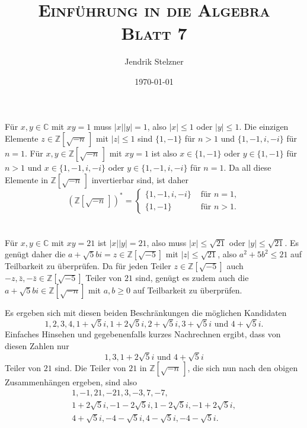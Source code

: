 \documentclass[a4paper,10pt]{article}
\title{\textsc{Einführung in die Algebra \\ \Large Blatt 7}}
\author{Jendrik Stelzner}
\date{\today}
\theoremstyle{definition}
\newcommand{\Z}{\mathbb{Z}}
\newcommand{\C}{\mathbb{C}}
\begin{document}
\maketitle





\section{}
Für $x,y \in \C$ mit $xy = 1$ muss $|x||y| = 1$, also $|x| \leq 1$ oder $|y| \leq 1$. Die einzigen Elemente $z \in \Z\left[\sqrt{-n}\,\right]$ mit $|z| \leq 1$ sind $\{1,-1\}$ für $n>1$ und $\{1,-1,i,-i\}$ für $n=1$. Für $x,y \in \Z\left[\sqrt{-n}\,\right]$ mit $xy = 1$ ist also $x \in \{1,-1\}$ oder $y \in \{1,-1\}$ für $n > 1$ und $x \in \{1,-1,i,-i\}$ oder $y \in \{1,-1,i,-i\}$ für $n=1$. Da all diese Elemente in $\Z\left[\sqrt{-n}\,\right]$ invertierbar sind, ist daher
\[
 \left(\Z\left[\sqrt{-n}\,\right]\right)^* =
 \begin{cases}
  \{1,-1,i,-i\} & \text{ für } n = 1, \\
  \{1,-1\}      & \text{ für } n > 1.
 \end{cases}
\]





\section{}
Für $x,y \in \C$ mit $xy=21$ ist $|x||y| = 21$, also muss $|x| \leq \sqrt{21}$ oder $|y| \leq \sqrt{21}$. Es genügt daher die $a+\sqrt{5}bi = z \in \Z[\sqrt{-5}]$ mit $|z| \leq \sqrt{21}$, also $a^2 + 5b^2 \leq 21$ auf Teilbarkeit zu überprüfen. Da für jeden Teiler $z \in \Z[\sqrt{-5}]$ auch $-z, \bar{z}, -\bar{z} \in \Z[\sqrt{-5}]$ Teiler von $21$ sind, genügt es zudem auch die $a+\sqrt{5}bi \in \Z[\sqrt{-n}]$ mit $a,b \geq 0$ auf Teilbarkeit zu überprüfen.

Es ergeben sich mit diesen beiden Beschränkungen die möglichen Kandidaten
\[
 1, 2, 3, 4, 1+\sqrt{5}i, 1+2\sqrt{5}i, 2+\sqrt{5}i, 3+\sqrt{5}i \text{ und } 4+\sqrt{5}i.
\]
Einfaches Hinsehen und gegebenenfalls kurzes Nachrechnen ergibt, dass von diesen Zahlen nur
\[
 1, 3, 1+2\sqrt{5}i \text{ und } 4+\sqrt{5}i
\]
Teiler von $21$ sind. Die Teiler von $21$ in $\Z\left[\sqrt{-n}\,\right]$, die sich nun nach den obigen Zusammenhängen ergeben, sind also
\begin{gather*}
 1, -1, 21, -21, 3, -3, 7, -7, \\
 1+2\sqrt{5}i, -1-2\sqrt{5}i, 1-2\sqrt{5}i, -1+2\sqrt{5}i, \\
 4+\sqrt{5}i, -4-\sqrt{5}i, 4-\sqrt{5}i, -4-\sqrt{5}i.
\end{gather*}
\end{document}
